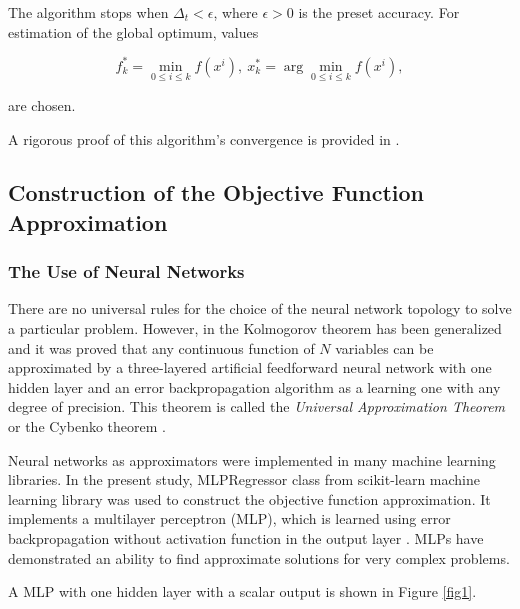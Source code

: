 \documentclass[mathematics,article,submit,pdftex,moreauthors]{Definitions/mdpi}
\begin{document}
The algorithm stops when $\Delta_t<\epsilon$, where $\epsilon>0$ is the preset accuracy. For estimation of the global optimum, values
\begin{linenomath}
\begin{equation}
f_k^\ast=\min_{0\leq i \leq k}f(x^i), \ x_k^\ast=\arg \min_{0\leq i \leq k}f(x^i),
\end{equation}
\end{linenomath}
are chosen.

A rigorous proof of this algorithm's convergence is provided in \cite{Strongin2000}. 



\subsection{Construction of the Objective Function Approximation}

\subsubsection{The Use of Neural Networks}

There are no universal rules for the choice of the neural network topology to solve a particular problem. However, in \cite{Cybenko1989} the Kolmogorov theorem has been generalized and it was proved that any continuous function of $N$ variables can be approximated by a three-layered artificial feedforward neural network with one hidden layer and an error backpropagation algorithm as a learning one with any degree of precision. This theorem is called the \textit{Universal Approximation Theorem} or the Cybenko theorem \cite{Hassoun1995}.

Neural networks as approximators were implemented in many machine learning libraries.
In the present study, MLPRegressor class from scikit-learn machine learning library was used  to construct the objective function approximation. It implements a multilayer perceptron (MLP), which is learned using error backpropagation without activation function in the output layer \cite{Nielsen1989}. MLPs have demonstrated an ability to find approximate solutions for very complex problems.

A MLP with one hidden layer with a scalar output is shown in Figure \ref{fig1}.
\end{document}
